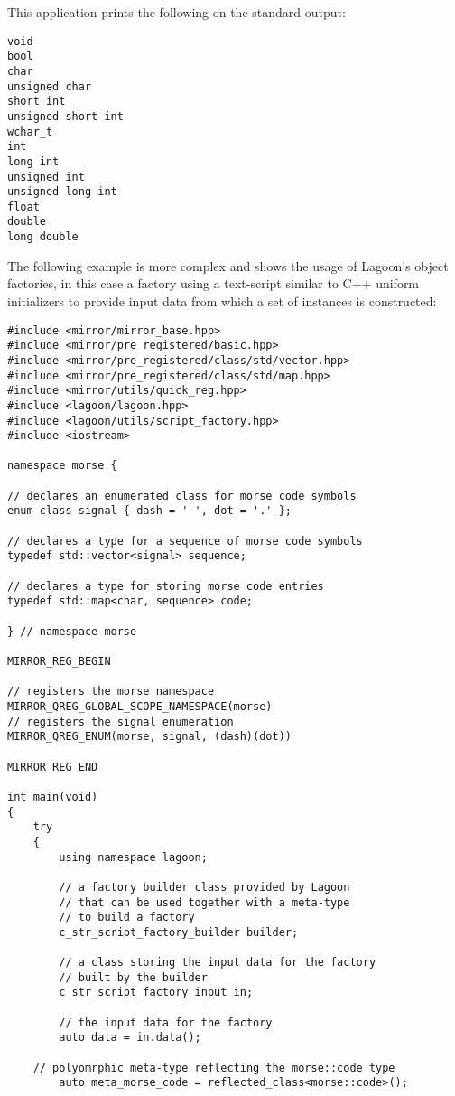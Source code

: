 This application prints the following on the standard output:

\begin{verbatim}
void
bool
char
unsigned char
short int
unsigned short int
wchar_t
int
long int
unsigned int
unsigned long int
float
double
long double
\end{verbatim}

The following example is more complex and shows the usage of Lagoon's
object factories, in this case a factory using a text-script similar
to C++ uniform initializers to provide input data from which a set
of instances is constructed:

\begin{lstlisting}
#include <mirror/mirror_base.hpp>
#include <mirror/pre_registered/basic.hpp>
#include <mirror/pre_registered/class/std/vector.hpp>
#include <mirror/pre_registered/class/std/map.hpp>
#include <mirror/utils/quick_reg.hpp>
#include <lagoon/lagoon.hpp>
#include <lagoon/utils/script_factory.hpp>
#include <iostream>

namespace morse {

// declares an enumerated class for morse code symbols
enum class signal { dash = '-', dot = '.' };

// declares a type for a sequence of morse code symbols
typedef std::vector<signal> sequence;

// declares a type for storing morse code entries
typedef std::map<char, sequence> code;

} // namespace morse

MIRROR_REG_BEGIN

// registers the morse namespace
MIRROR_QREG_GLOBAL_SCOPE_NAMESPACE(morse)
// registers the signal enumeration
MIRROR_QREG_ENUM(morse, signal, (dash)(dot))

MIRROR_REG_END

int main(void)
{
    try
    {
        using namespace lagoon;

        // a factory builder class provided by Lagoon
        // that can be used together with a meta-type
        // to build a factory
        c_str_script_factory_builder builder;

        // a class storing the input data for the factory
        // built by the builder
        c_str_script_factory_input in;

        // the input data for the factory
        auto data = in.data();

	// polyomrphic meta-type reflecting the morse::code type
        auto meta_morse_code = reflected_class<morse::code>();


\end{lstlisting}
